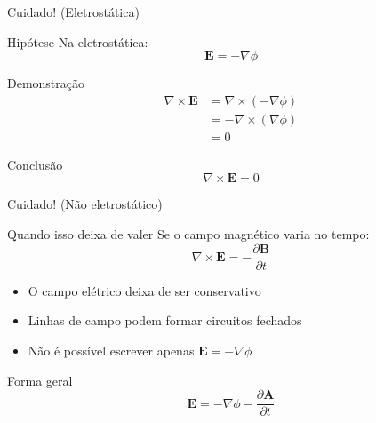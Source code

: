 \documentclass[aspectratio=169]{beamer}
\begin{document}
\begin{frame}{Cuidado! (Eletrostática)}

\begin{block}{Hipótese}
Na eletrostática:
\begin{equation}
\mathbf{E} = -\nabla \phi
\end{equation}
\end{block}

\begin{block}{Demonstração}
\begin{align}
\nabla \times \mathbf{E}
&= \nabla \times (-\nabla \phi) \\
&= - \nabla \times (\nabla \phi) \\
&= 0
\end{align}
\end{block}

\begin{alertblock}{Conclusão}
\begin{equation}
\nabla \times \mathbf{E} = 0
\end{equation}
\end{alertblock}

\end{frame}


\begin{frame}{Cuidado! (Não eletrostático)}

\begin{alertblock}{Quando isso deixa de valer}
Se o campo magnético varia no tempo:
\begin{equation}
\nabla \times \mathbf{E} = -\frac{\partial \mathbf{B}}{\partial t}
\end{equation}
\end{alertblock}

\begin{itemize}
\item O campo elétrico deixa de ser conservativo
\item Linhas de campo podem formar circuitos fechados
\item Não é possível escrever apenas \(\mathbf{E} = -\nabla \phi\)
\end{itemize}

\vspace{0.3cm}

\begin{block}{Forma geral}
\begin{equation}
\mathbf{E} = -\nabla \phi - \frac{\partial \mathbf{A}}{\partial t}
\end{equation}
\end{block}

\end{frame}
\end{document}
